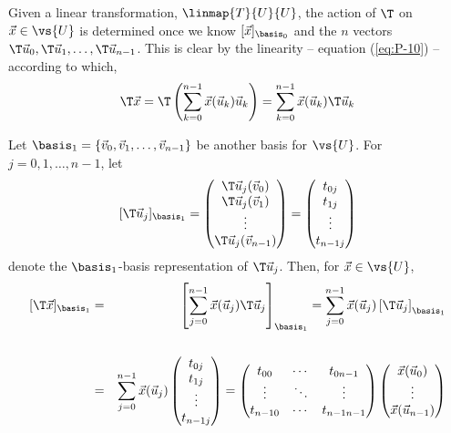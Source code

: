 Given a linear transformation, $\linmap{T}{U}{U}$, the action
of $\T$ on $\vec{x} \in \vs{U}$ is determined once we know $[\vec{x}]_{\basis_0}$ 
and the $n$ vectors $\T\vec{u}_0, \T\vec{u}_1, \ldots, \T\vec{u}_{n-1}$.  This
is clear by the linearity -- equation (\ref{eq:P-10}) -- according to which,
\[
\T\vec{x} = \T\left(\sum_{k=0}^{n-1}\vec{x}(\vec{u}_k) \vec{u}_k\right) 
= \sum_{k=0}^{n-1} \vec{x}(\vec{u}_k) \T\vec{u}_k 
\]

Let $\basis_1 = \{\vec{v}_0, \vec{v}_1, \ldots, \vec{v}_{n-1}\}$ be another
basis for $\vs{U}$. For $j = 0, 1, \ldots, n-1$, let
\[ 
[\T\vec{u}_j]_{\basis_1} =  
\begin{pmatrix}
\T\vec{u}_j(\vec{v}_0) \\ \T\vec{u}_j(\vec{v}_1) \\ \vdots \\ \T\vec{u}_j(\vec{v}_{n-1})
\end{pmatrix}=
\begin{pmatrix}
t_{0j} \\ t_{1j} \\ \vdots \\ t_{{n-1}j} 
\end{pmatrix}
\]
denote the $\basis_1$-basis representation of $\T\vec{u}_j$.
Then, for $\vec{x} \in \vs{U}$,
\begin{eqnarray}\label{eq:I-12}
[\T\vec{x}]_{\basis_1} 
&=&  
\left[ \sum_{j=0}^{n-1} \vec{x}(\vec{u}_j) \T \vec{u}_j \right]_{\basis_1}
=\sum_{j=0}^{n-1} \vec{x}(\vec{u}_j) \left[ \T \vec{u}_j \right]_{\basis_1}\nonumber\\
&&\\
&=&\sum_{j=0}^{n-1} \vec{x}(\vec{u}_j) \begin{pmatrix}t_{0j}\\t_{1j}\\\vdots\\t_{{n-1}j}\end{pmatrix}
=
\begin{pmatrix}
        t_{00} & \cdots & t_{0{n-1}} \\ 
        \vdots & \ddots & \vdots \\
        t_{{n-1}0} & \cdots & t_{{n-1}{n-1}} 
\end{pmatrix}
\begin{pmatrix}
        \vec{x}(\vec{u}_0) \\ \vdots \\ \vec{x}(\vec{u}_{n-1}) 
\end{pmatrix}\nonumber
\end{eqnarray}
